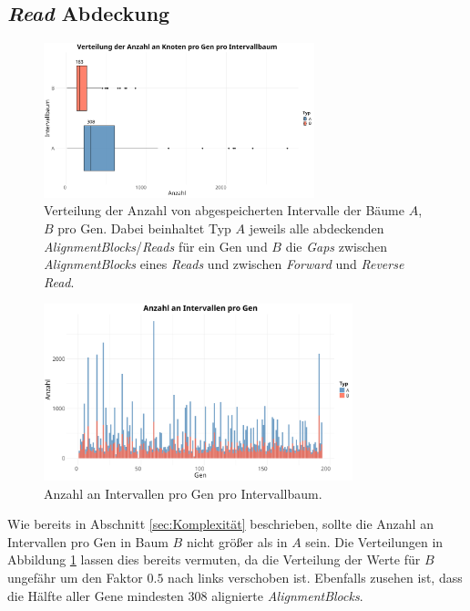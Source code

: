 \documentclass[12pt]{article}
\begin{document}
\subsection{\textit{Read} Abdeckung}\label{sec:-textit-Read-Abdeckung}
\begin{figure}[htpb]
    \centering
    \includegraphics[width=0.7\textwidth]{./plots/trees.png}
    \caption{Verteilung der Anzahl von abgespeicherten Intervalle der Bäume $A$, $B$ pro Gen.
    Dabei beinhaltet Typ $A$ jeweils alle abdeckenden \textit{AlignmentBlocks}/\textit{Reads} für ein Gen und $B$ die \textit{Gaps} zwischen
    \textit{AlignmentBlocks} eines \textit{Reads} und zwischen \textit{Forward} und \textit{Reverse Read}.}
    \label{fig:-plots-trees-png}
\end{figure}
\begin{figure}[htpb]
    \centering
    \includegraphics[width=0.8\textwidth]{./plots/genetrees.png}
    \caption{Anzahl an Intervallen pro Gen pro Intervallbaum.}
    \label{fig:-plots-genetrees-png}
\end{figure}
Wie bereits in Abschnitt \ref{sec:Komplexität} beschrieben, sollte die Anzahl an Intervallen pro Gen in Baum $B$ nicht 
grö\ss er als in $A$ sein. Die Verteilungen in Abbildung \ref{fig:-plots-trees-png} lassen dies bereits vermuten, da die Verteilung der Werte für 
$B$ ungefähr um den Faktor $0.5$ nach links verschoben ist.
Ebenfalls zusehen ist, dass die Hälfte aller Gene mindesten 308 alignierte \textit{AlignmentBlocks}.
\end{document}
